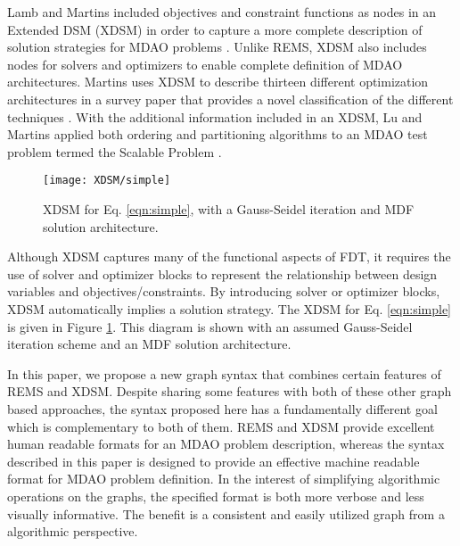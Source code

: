     Lamb and Martins included objectives and constraint functions as nodes
    in an Extended DSM (XDSM) in order to capture a more complete description
    of solution strategies for MDAO problems \cite{Lambe2012}. Unlike REMS,
    XDSM also includes nodes for solvers and optimizers to enable complete
    definition of MDAO architectures. Martins uses XDSM to describe thirteen different
    optimization architectures in a survey paper that provides a novel
    classification of the different techniques \cite{Lambe2011}. With the
    additional information included in an XDSM, Lu and Martins applied both
    ordering and partitioning algorithms to an MDAO test problem termed the
    Scalable Problem \cite{Lu2012}.

    \begin{figure}
        \begin{center}
        \texttt{[image: XDSM/simple]}
        \caption{XDSM for Eq. \ref{eqn:simple}, with a Gauss-Seidel iteration
          and MDF solution architecture. \label{fig:XDSM_simple}}
        \end{center}
    \end{figure}

    Although XDSM captures many of the functional aspects of FDT, it
    requires the use of solver and optimizer blocks to represent
    the relationship between design variables and objectives/constraints.
    By introducing solver or optimizer blocks, XDSM automatically implies a solution strategy.
    The XDSM for Eq. \ref{eqn:simple} is given in Figure \ref{fig:XDSM_simple}.
    This diagram is shown with an assumed Gauss-Seidel iteration scheme and an MDF solution architecture.

    In this paper, we propose a new graph syntax that combines certain features of REMS and XDSM.
    Despite sharing some features with both of these other graph based approaches, the syntax
    proposed here has a fundamentally different goal which is complementary to both of them.
    REMS and XDSM provide excellent human readable formats for an MDAO problem description, whereas the
    syntax described in this paper is designed to provide an effective machine readable format for MDAO problem definition.
    In the interest of simplifying algorithmic operations on the graphs, the specified
    format is both more verbose and less visually informative. The benefit is a consistent
    and easily utilized graph from a algorithmic perspective.

